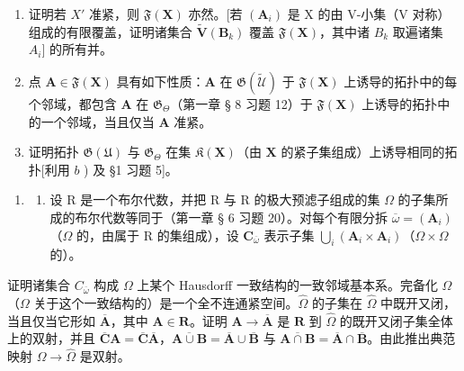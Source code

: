 \begin{enumerate}
\def\labelenumi{\alph{enumi})}
\item
  证明若 \(X'\) 准紧，则 \(\mathfrak{F}(\mathbf{X})\) 亦然。{[}若 \((\mathbf{A}_{i})\) 是 X 的由 V-小集（V 对称）组成的有限覆盖，证明诸集合 \(\tilde{\mathbf{V}}(\mathbf{B}_{k})\) 覆盖 \(\mathfrak{F}(\mathbf{X})\)，其中诸 \(B_{k}\) 取遍诸集 \(A_{i}]\) 的所有并。
\item
  点 \(\mathbf{A} \in \mathfrak{F}(\mathbf{X})\) 具有如下性质：\(\mathbf{A}\) 在 \(\mathfrak{G}(\tilde{\mathcal{U}})\) 于 \(\mathfrak{F}(\mathbf{X})\) 上诱导的拓扑中的每个邻域，都包含 \(\mathbf{A}\) 在 \(\mathfrak{G}_{\Theta}\)（第一章 § 8 习题 12）于 \(\mathfrak{F}(\mathbf{X})\) 上诱导的拓扑中的一个邻域，当且仅当 \(\mathbf{A}\) 准紧。
\item
  证明拓扑 \(\mathfrak{G}(\mathfrak{U})\) 与 \(\mathfrak{G}_{\Theta}\) 在集 \(\mathfrak{K}(\mathbf{X})\)（由 \(\mathbf{X}\) 的紧子集组成）上诱导相同的拓扑{[}利用 \(b\) ) 及 §1 习题 5{]}。
\end{enumerate}

\begin{enumerate}
\def\labelenumi{\arabic{enumi})}
\setcounter{enumi}{11}
\tightlist
\item
  \begin{enumerate}
  \def\labelenumii{\alph{enumii})}
  \tightlist
  \item
    设 R 是一个布尔代数，并把 R 与 R 的极大预滤子组成的集 \(\Omega\) 的子集所成的布尔代数等同于（第一章 § 6 习题 20）。对每个有限分拆 \(\overline{\omega} = (\mathbf{A}_i)\)（\(\Omega\) 的，由属于 R 的集组成），设 \(\mathbf{C}_{\overline{\omega}}\) 表示子集 \(\bigcup_{i} (\mathbf{A}_i \times \mathbf{A}_i)\)（\(\Omega \times \Omega\) 的）。
  \end{enumerate}
\end{enumerate}

证明诸集合 \(C_{\overline{\omega}}\) 构成 \(\Omega\) 上某个 Hausdorff 一致结构的一致邻域基本系。完备化 \(\hat{\Omega}\)（\(\Omega\) 关于这个一致结构的）是一个全不连通紧空间。\(\hat{\Omega}\) 的子集在 \(\hat{\Omega}\) 中既开又闭，当且仅当它形如 \(\overline{\mathbf{A}}\)，其中 \(\mathbf{A} \in \mathbf{R}\)。证明 \(\mathbf{A} \to \overline{\mathbf{A}}\) 是 \(\mathbf{R}\) 到 \(\hat{\Omega}\) 的既开又闭子集全体上的双射，并且 \(\overline{\mathbf{C}}\mathbf{A} = \overline{\mathbf{C}}\overline{\mathbf{A}}\)，\(\overline{\mathbf{A} \cup \mathbf{B}} = \overline{\mathbf{A}} \cup \overline{\mathbf{B}}\) 与 \(\overline{\mathbf{A} \cap \mathbf{B}} = \overline{\mathbf{A}} \cap \overline{\mathbf{B}}\)。由此推出典范映射 \(\Omega \to \hat{\Omega}\) 是双射。

